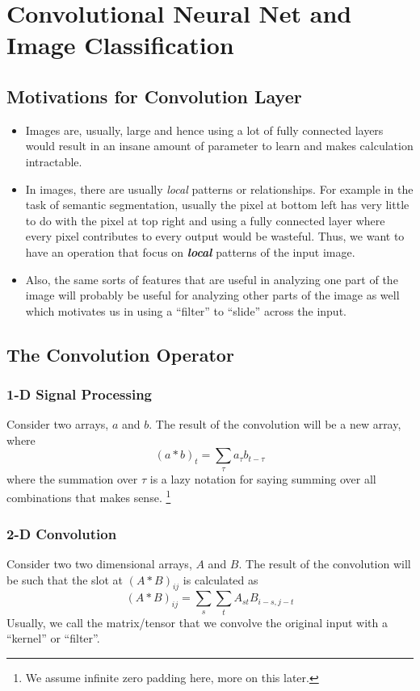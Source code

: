 \documentclass[11pt]{article}
\begin{document}
\section{Convolutional Neural Net and Image Classification}
\subsection{Motivations for Convolution Layer}
\begin{itemize}
    \item Images are, usually, large and hence using a lot of fully connected layers would result in an insane amount of parameter to learn and makes calculation intractable.
    \item In images, there are usually \textit{local} patterns or relationships. For example in the task of semantic segmentation, usually the pixel at bottom left has very little to do with the pixel at top right and using a fully connected layer where every pixel contributes to every output would be wasteful. Thus, we want to have an operation that focus on \textit{\textbf{local}} patterns of the input image.
    \item Also, the same sorts of features that are useful in analyzing one part of the image will probably be useful for analyzing other parts of the image as well which motivates us in using a ``filter'' to ``slide'' across the input. 
\end{itemize}

\subsection{The Convolution Operator}
\subsubsection{1-D Signal Processing} Consider two arrays, $a$ and $b$. The result of the convolution will be a new array, where
\begin{equation}
    (a * b)_{t}=\sum_{\tau} a_{\tau} b_{t-\tau}
\end{equation}
where the summation over $\tau$ is a lazy notation for saying summing over all combinations that makes sense. \footnote{We assume infinite zero padding here, more on this later.}

\subsubsection{2-D Convolution}
Consider two two dimensional arrays, $A$ and $B$. The result of the convolution will be such that the slot at $(A\ast B)_{ij}$ is calculated as
\begin{equation}
    (A * B)_{i j}=\sum_{s} \sum_{t} A_{s t} B_{i-s, j-t}
\end{equation}
Usually, we call the matrix/tensor that we convolve the original input with a ``kernel'' or ``filter''. 
\end{document}
